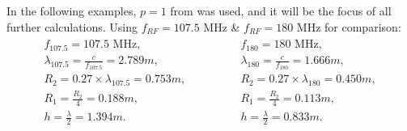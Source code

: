 \documentclass{article}
\begin{document}
In the following examples, $p=1$ from  was used, and it will be the focus of all further calculations.
Using $f_{RF}=107.5$ MHz \& $f_{RF}=180$ MHz for comparison:
\vspace{-30pt}
\begin{eqnarray} \label{eq:107_180_MHZ_cavity_design_parameters}
    \begin{aligned}
        f_{107.5} = 107.5 \textrm{ MHz}  , \\
        \lambda_{107.5}  = \frac{c}{f_{107.5}} = 2.789 m   ,\\
        R_2 = 0.27 \times \lambda_{107.5} = 0.753 m   ,\\
        R_1 = \frac{R_2}{4} = 0.188 m   ,\\
        h = \frac{\lambda}{2} = 1.394 m .
    \end{aligned}
    \qquad\qquad
    \begin{aligned}
        f_{180} = 180 \textrm{ MHz}   ,\\
        \lambda_{180}  = \frac{c}{f_{180}} = 1.666 m  , \\
        R_2 = 0.27 \times\lambda_{180} = 0.450 m  , \\
        R_1 = \frac{R_2}{4} = 0.113 m  , \\
        h = \frac{\lambda}{2} = 0.833 m . 
    \end{aligned}
\end{eqnarray}
\end{document}
